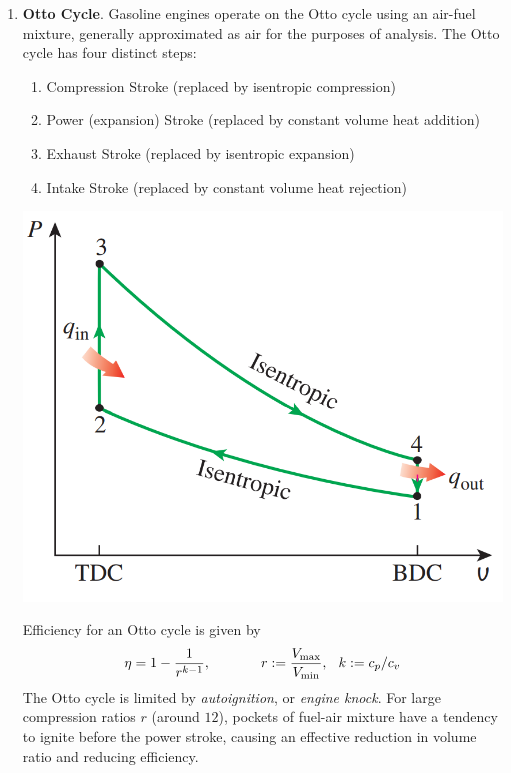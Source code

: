 \begin{enumerate}
    \item[] \textbf{Otto Cycle}. Gasoline engines operate on the Otto cycle using an air-fuel mixture, generally approximated as air for the purposes of analysis. The Otto cycle has four distinct steps:
    \begin{enumerate}
        \item Compression Stroke (replaced by isentropic compression)
        \item Power (expansion) Stroke (replaced by constant volume heat addition)
        \item Exhaust Stroke (replaced by isentropic expansion)
        \item Intake Stroke (replaced by constant volume heat rejection)
    \end{enumerate}
    \begin{center}
        \includegraphics[width=0.4\linewidth]{Images/thermo otto.png}
    \end{center}
    Efficiency for an Otto cycle is given by \[\eta = 1 - \frac{1}{r^{k-1}},\hspace{0.5in}r:=\frac{V_\text{max}}{V_\text{min}},\hspace{0.1in} k:=c_p/c_v\]
    The Otto cycle is limited by \textit{autoignition}, or \textit{engine knock}. For large compression ratios $r$ (around $12$), pockets of fuel-air mixture have a tendency to ignite before the power stroke, causing an effective reduction in volume ratio and reducing efficiency.


\end{enumerate}
